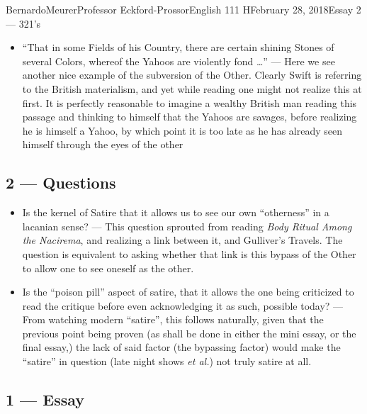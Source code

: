 \documentclass[12pt,letterpaper]{article}
\begin{document}
\begin{mla}{Bernardo}{Meurer}{Professor Eckford-Prossor}{English 111 H}{February 28, 2018}{Essay 2 --- 321's}
\begin{itemize}
        \item ``That in some Fields of his Country, there are certain shining Stones of several Colors, whereof the Yahoos are violently fond \ldots''
              \newline
              --- Here we see another nice example of the subversion of the Other. Clearly Swift is referring to the British materialism, and yet while reading one might not realize this at first. It is perfectly reasonable to imagine a wealthy British man reading this passage and thinking to himself that the Yahoos are savages, before realizing he is himself a Yahoo, by which point it is too late as he has already seen himself through the eyes of the other
    \end{itemize}
    \subsection*{2 --- Questions}
    \begin{itemize}
        \item Is the kernel of Satire that it allows us to see our own ``otherness'' in a lacanian sense? --- This question sprouted from reading \textit{Body Ritual Among the Nacirema}, and realizing a link between it, and Gulliver's Travels. The question is equivalent to asking whether that link is this bypass of the Other to allow one to see oneself as the other.
        \item Is the ``poison pill'' aspect of satire, that it allows the one being criticized to read the critique before even acknowledging it as such, possible today? --- From watching modern ``satire'', this follows naturally, given that the previous point being proven (as shall be done in either the mini essay, or the final essay,) the lack of said factor (the bypassing factor) would make the ``satire'' in question (late night shows \textit{et al.}) not truly satire at all.
    \end{itemize}
    \subsection*{1 --- Essay}

\end{mla}
\end{document}
